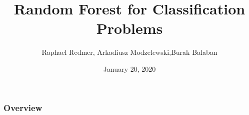 \documentclass{beamer}
\title{Random Forest for Classification Problems} %
\author[Redmer, Modzelewski, Balaban]{Raphael Redmer, Arkadiusz Modzelewski,\newline Burak Balaban}
\institute[Uni Bonn]{University of Bonn \\ Research Module in Econometrics and Statistics}
\date{January 20, 2020} %
\begin{document}
\begin{frame}
    \titlepage %
\end{frame}

\begin{frame}
\frametitle{Overview} %
\tableofcontents %
\end{frame}


%

















% 
\end{document}
